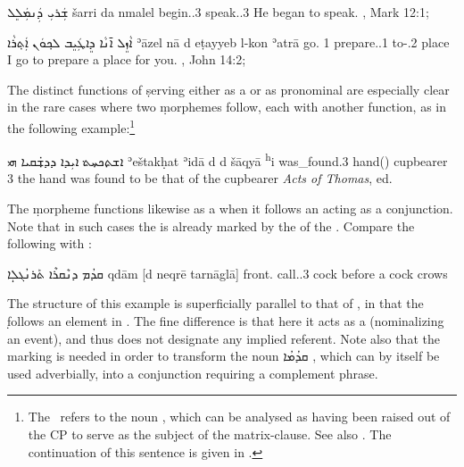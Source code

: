 {{  
  {ܫܲܪܝܼ ܕܲܢܡܲܠܸܠ}
  {šarri da\cb{} nmalel}
  {begin.\prf.3\masc{} \lnkcomp\cb{} speak.\iprf.3\masc{}}
  {He began to speak.}
  {\Pesh, Mark 12:1; \cite[65, \S 82]{MuraokaSyriac}}

  
  {ܐܵܙܸܠ ܐ̄ܢܵܐ ܕܸܐܛܲܝܸܒ ܠܟ݂ܘܿܢ ܐܲܬ݂ܪܵܐ}
  {ʾāzel \cb{}nā  d\cb{} eṭayyeb l-kon ʾatrā}
  {go.\ptcp{} \cb{}1\sg{}  \lnkcomp\cb{} prepare.\iprf.1\sg{} to-\poss.2\mpl{} place}
  {I go to prepare a place for you.}
  {\Pesh, John 14:2; \cite[65, \S 82]{MuraokaSyriac}}
  
  The distinct functions of \d serving either as a  or as pronominal \lnk*  are especially clear in the rare cases where two \d morphemes follow, each with another function, as in the following example:\footnote{The \zero\ \prim refers to the noun , which can be analysed as having been raised out of the CP to serve as the subject of the matrix-clause. See also \citet[35*, fn. 51]{MuraokaSyriac}. The continuation of this sentence is given in .}
  
  {ܐܫܬ̣ܟܚ̣ܬ݀ ܐܝܼܕܐ ܕܕܫ̣̇ܩܝܐ ܗܝ}
  {ʾeštakḥat ʾidā d\cb{} \zero{} d\cb{} šāqyā \cb{}\textsuperscript{h}i}
  {was\_found.3\fem{} hand(\fem) \lnkcomp\cb{} \zero{} \lnk\cb{} cupbearer \cb{}3\fem{}}
  {the hand was found to be that of the cupbearer}
  {\textit{Acts of Thomas}, ed.\ \linebreak \cite[]{WrightActs}}
  
  \largerpage
  The \d morpheme functions likewise as a \comp* when it follows an  acting as a conjunction. Note that in such cases the   is already marked by the \cst* of the . Compare the following with :
  
  {ܩܕܳܡ ܕܢܶܩܪܶܐ ܬܰܪܢܳܓܠܴܐ}
  {qdām [d\cb{} neqrē tarnāglā]}
  {front.\cst{} \hspace{0.7ex}\lnkcomp\cb{} call.\iprf.3\masc{} cock}
  {before a cock crows}
  {\cite[490]{CSD}}
  
  The structure of this example is superficially parallel to that of , in that the \d follows an element in \cst*. The fine difference is that here it acts as a \comp* (nominalizing an event), and thus does not designate any implied referent. Note also that the \cst* marking is needed in order to transform the noun \textsyriac{ܩܕܳܡܳܐ} , which can by itself be used adverbially, into
  a conjunction requiring a complement phrase. 
  

}}

